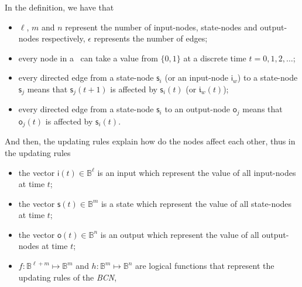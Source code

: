 In the definition, we have that %
\begin{itemize}
	\item $\ell$, $m$ and $n$ represent the number of input-nodes, state-nodes and output-nodes respectively, $\epsilon$ represents the number of edges;
          \item every node in a \BCN\ can take a value from $\{0,1\}$ at a discrete time $t=0, 1, 2,\ldots$;
	\item every directed edge from a state-node $\mathsf{s}_i$ (or an input-node $\mathsf{i}_w$) to a state-node $\mathsf{s}_j$ means that  $\mathsf{s}_j(t+1)$ is affected by $\mathsf{s}_i(t)$ (or $\mathfrak{i}_w(t)$);	
	\item every directed edge from a state-node $\mathsf{s}_i$ to an output-node $\mathsf{o}_j$ means that   $\mathsf{o}_j(t)$  is affected by $\mathsf{s}_i(t)$.  
	\end{itemize}
And then, the updating rules explain how do the nodes affect each other, thus in the updating rules
	\begin{itemize}
	\item the vector $\mathsf{i}(t)\in \mathbb{B}^{\ell}$ is an input which represent the value of all input-nodes at time $t$; 	
	\item the vector $\mathsf{s}(t)\in \mathbb{B}^m$ is a state which represent the value of all state-nodes at time $t$; 	
	\item the vector $\mathsf{o}(t)\in \mathbb{B}^n$ is an output which represent the value of all output-nodes at time $t$;  
	\item $f:\mathbb{B}^{\ell +m}\mapsto \mathbb{B}^m$ and $h:\mathbb{B}^m\mapsto \mathbb{B}^n$ are logical functions that represent the updating rules of the {\em BCN},
\end{itemize}

